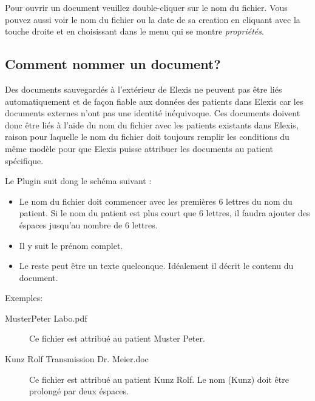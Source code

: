 Pour ouvrir un document veuillez double-cliquer  sur le nom du fichier. Vous pouvez aussi voir le nom du fichier ou la date de sa creation en cliquant avec la touche droite et en choisissant dans le menu qui se montre \textit{propriétés}.

\subsection{Comment nommer un document?}

Des documents sauvegardés à l'extérieur de Elexis ne peuvent pas être liés automatiquement et de façon fiable aux données des patients dans Elexis car les documents externes n'ont pas une identité inéquivoque. Ces documents doivent donc être liés à l'aide du nom du fichier avec les patients existants dans Elexis, raison pour laquelle le nom du fichier doit toujours remplir les conditions du même modèle pour que Elexis puisse attribuer les documents au patient spécifique.

Le Plugin suit dong le schéma suivant :

\begin{itemize}
\item Le nom du fichier doit commencer avec les premières 6 lettres du nom du patient. Si le nom du patient est plus court que 6 lettres, il faudra ajouter des éspaces jusqu'au nombre de 6 lettres.
\item Il y suit le prénom complet.
\item Le reste peut être un texte quelconque. Idéalement il décrit le contenu du document.
\end{itemize}

Exemples:

\begin{description}
\item[MusterPeter Labo.pdf]
Ce fichier est attribué au patient Muster Peter.
\item[Kunz  Rolf Transmission Dr. Meier.doc]
Ce fichier est attribué au patient Kunz Rolf. Le nom (Kunz) doit être prolongé par deux éspaces.
\end{description}
